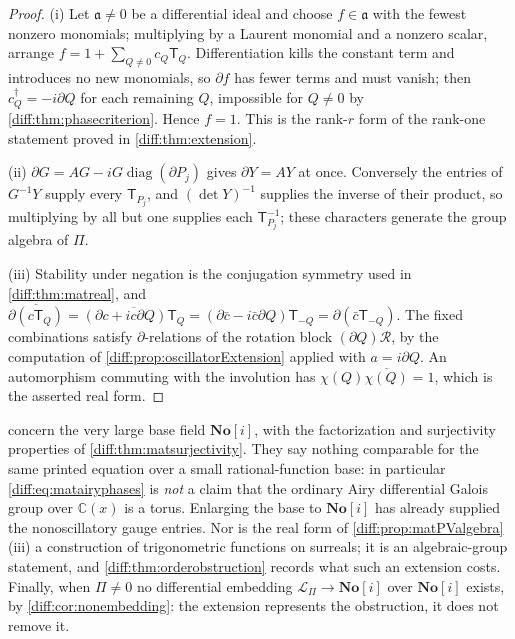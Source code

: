 \documentclass[11pt,letterpaper]{article}
\numberwithin{equation}{section}
\theoremstyle{definition}
\theoremstyle{remark}
\newcommand{\SC}{\mathbf{No}[i]}
\newcommand{\C}{\mathbb C}
\newcommand{\der}{\partial}
\newcommand{\Rot}{\mathcal R}
\begin{document}
\begin{proof}
(i) Let $\mathfrak a\neq0$ be a differential ideal and choose $f\in\mathfrak a$
with the fewest nonzero monomials; multiplying by a Laurent monomial and a
nonzero scalar, arrange $f=1+\sum_{Q\neq0}c_{Q}\mathsf T_{Q}$. Differentiation
kills the constant term and introduces no new monomials, so $\der f$ has fewer
terms and must vanish; then $c_{Q}^{\dagger}=-i\der Q$ for each remaining $Q$,
impossible for $Q\neq0$ by \cref{diff:thm:phasecriterion}. Hence $f=1$.
This is the rank-$r$ form of the rank-one statement proved in
\cref{diff:thm:extension}.

(ii) $\der G=AG-i G\operatorname{diag}(\der P_{j})$ gives $\der Y=AY$ at once.
Conversely the entries of $G^{-1}Y$ supply every $\mathsf T_{P_{j}}$, and
$(\det Y)^{-1}$ supplies the inverse of their product, so multiplying by all
but one supplies each $\mathsf T_{P_{j}}^{-1}$; these characters generate the
group algebra of $\Pi$.

(iii) Stability under negation is the conjugation symmetry used in
\cref{diff:thm:matreal}, and
$\overline{\der(c\mathsf T_{Q})}=\overline{(\der c+ic\der Q)\mathsf T_{Q}}
=(\der\bar c-i\bar c\der Q)\mathsf T_{-Q}=\der(\bar c\mathsf T_{-Q})$. The
fixed combinations satisfy $\der$-relations of the rotation block
$(\der Q)\Rot$, by the computation of
\cref{diff:prop:oscillatorExtension} applied with $a=i\der Q$. An automorphism
commuting with the involution has $\chi(Q)\overline{\chi(Q)}=1$, which is the
asserted real form.
\end{proof}

\begin{warning}
\label{diff:warn:mattorus}
 concern the very large base
field $\SC$, with the factorization and surjectivity properties of
\cref{diff:thm:matsurjectivity}. They say nothing comparable for the same
printed equation over a small rational-function base: in particular
\cref{diff:eq:matairyphases} is \emph{not} a claim that the ordinary Airy
differential Galois group over $\C(x)$ is a torus. Enlarging the base to $\SC$
has already supplied the nonoscillatory gauge entries. Nor is the real form of
\cref{diff:prop:matPValgebra}(iii) a construction of trigonometric functions on
surreals; it is an algebraic-group statement, and
\cref{diff:thm:orderobstruction} records what such an extension costs. Finally,
when $\Pi\neq0$ no differential embedding $\mathcal L_{\Pi}\to\SC$ over $\SC$
exists, by \cref{diff:cor:nonembedding}: the extension represents the
obstruction, it does not remove it.
\end{warning}
\end{document}
